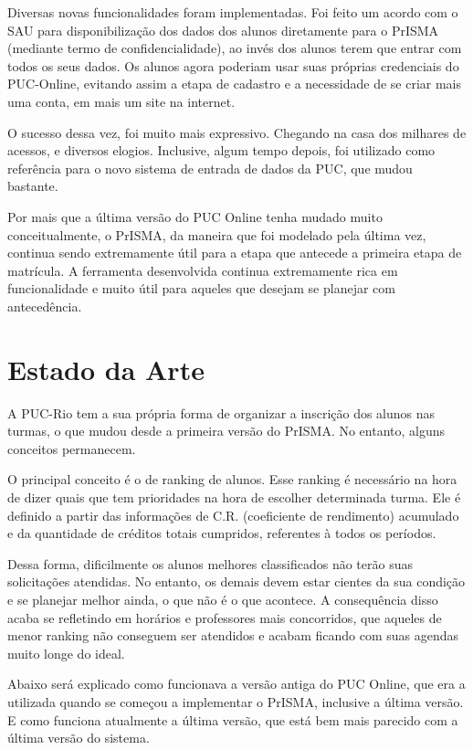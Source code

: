 \documentclass[graduacao,brazil]{ThesisPUC}
\begin{document}
Diversas novas funcionalidades foram implementadas. Foi feito um acordo com o SAU para disponibilização dos dados dos alunos diretamente para o PrISMA (mediante termo de confidencialidade), ao invés dos alunos terem que entrar com todos os seus dados. Os alunos agora poderiam usar suas próprias credenciais do PUC-Online, evitando assim a etapa de cadastro e a necessidade de se criar mais uma conta, em mais um site na internet.

O sucesso dessa vez, foi muito mais expressivo. Chegando na casa dos milhares de acessos, e diversos elogios. Inclusive, algum tempo depois, foi utilizado como referência para o novo sistema de entrada de dados da PUC, que mudou bastante.

Por mais que a última versão do PUC Online tenha mudado muito conceitualmente, o PrISMA, da maneira que foi modelado pela última vez, continua sendo extremamente útil para a etapa que antecede a primeira etapa de matrícula. A ferramenta desenvolvida continua extremamente rica em funcionalidade e muito útil para aqueles que desejam se planejar com antecedência.


\chapter{Estado da Arte} %

A PUC-Rio tem a sua própria forma de organizar a inscrição dos alunos nas turmas, o que mudou desde a primeira versão do PrISMA. No entanto, alguns conceitos permanecem.

O principal conceito é o de ranking de alunos. Esse ranking é necessário na hora de dizer quais que tem prioridades na hora de escolher determinada turma. Ele é definido a partir das informações de C.R. (coeficiente de rendimento) acumulado e da quantidade de créditos totais cumpridos, referentes à todos os períodos.

Dessa forma, dificilmente os alunos melhores classificados não terão suas solicitações atendidas. No entanto, os demais devem estar cientes da sua condição e se planejar melhor ainda, o que não é o que acontece. A consequência disso acaba se refletindo em horários e professores mais concorridos, que aqueles de menor ranking não conseguem ser atendidos e acabam ficando com suas agendas muito longe do ideal.

Abaixo será explicado como funcionava a versão antiga do PUC Online, que era a utilizada quando se começou a implementar o PrISMA, inclusive a última versão. E como funciona atualmente a última versão, que está bem mais parecido com a última versão do sistema.
\end{document}
